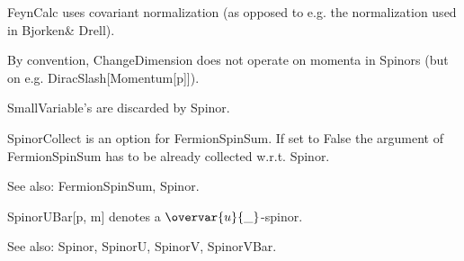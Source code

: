 

FeynCalc uses covariant normalization (as opposed to e.g. the normalization used in Bjorken\&{ }Drell).







By convention, ChangeDimension does not operate on momenta in Spinors (but on e.g. { }DiracSlash[Momentum[p]]).





SmallVariable's are discarded by Spinor.





SpinorCollect is an option for FermionSpinSum. If set to False the { }argument of FermionSpinSum has to be already collected w.r.t.
  Spinor.

See also: { }FermionSpinSum, Spinor.



SpinorUBar[p, m] denotes a \(\overvar{u}{\_}\)-spinor.

See also:  Spinor, SpinorU, SpinorV, SpinorVBar.

